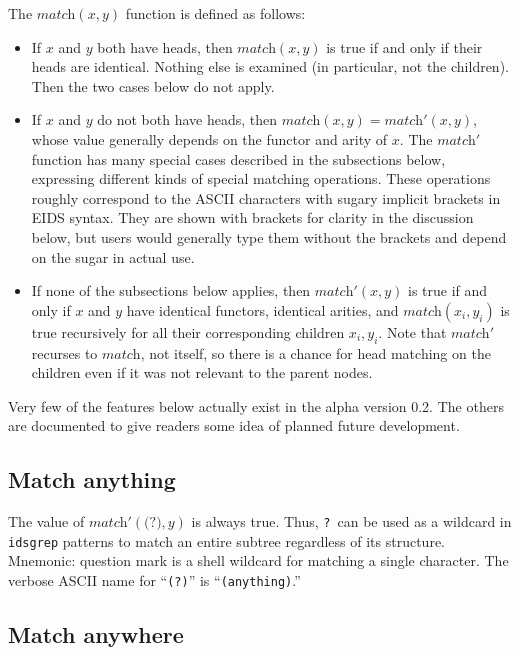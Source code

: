 \documentclass[twocolumn]{report}
\begin{document}
The $\textit{match}(x,y)$ function is defined as follows:
\begin{itemize}
  \item If $x$ and $y$ both have heads, then $\textit{match}(x,y)$ is true
    if and only if their heads are identical.  Nothing else is examined (in
    particular, not the children).  Then the two cases below do not apply.
  \item If $x$ and $y$ do not both have heads, then
    $\textit{match}(x,y)=\textit{match}'(x,y)$, whose value
    generally depends on the functor and arity of $x$.  The
    $\textit{match}'$ function has many special cases described in the
    subsections below, expressing different kinds of special matching
    operations.  These operations roughly correspond to the ASCII
    characters with sugary implicit brackets in EIDS syntax.  They are
    shown with brackets for clarity in the discussion below, but users
    would generally type them without the brackets and depend on the
    sugar in actual use.
  \item If none of the subsections below applies, then
    $\textit{match}'(x,y)$ is true if and only if $x$ and $y$ have identical
    functors, identical arities, and $\textit{match}(x_i,y_i)$ is true
    recursively for all their corresponding children $x_i,y_i$.  Note that
    $\textit{match}'$ recurses to $\textit{match}$, not itself, so
    there is a chance for head matching on the children even if it was
    not relevant to the parent nodes.
\end{itemize}

Very few of the features below actually exist in the alpha version 0.2.  The
others are documented to give readers some idea of planned future
development.

\subsection{Match anything}

The value of $\textit{match}'(\texttt{(?)},y)$ is always true.  Thus,
\texttt{?}\ can be used as a wildcard in \texttt{idsgrep} patterns to match
an entire subtree regardless of its structure.  Mnemonic:  question mark
is a shell wildcard for matching a single character.
The verbose ASCII name for ``\texttt{(?)}'' is ``\texttt{(anything)}.''

\subsection{Match anywhere}
\end{document}
